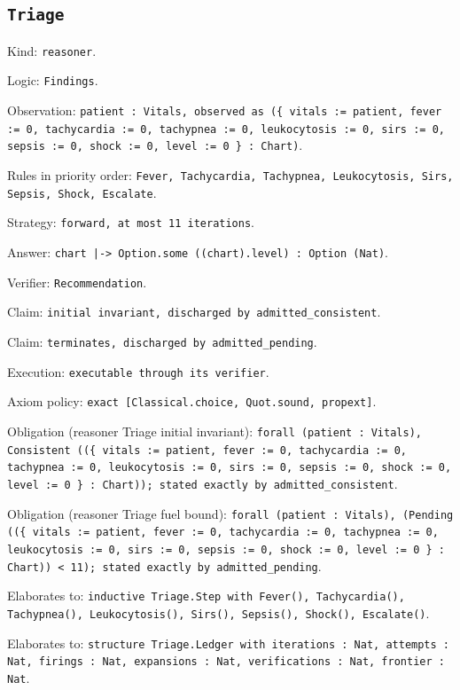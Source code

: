 \documentclass[11pt]{article}
\begin{document}
\subsection*{\texttt{Triage}}
\noindent Kind: \texttt{reasoner}.\par
\noindent Logic: \texttt{Findings}.\par
\noindent Observation: \texttt{patient : Vitals, observed as (\{ vitals := patient, fever := 0, tachycardia := 0, tachypnea := 0, leukocytosis := 0, sirs := 0, sepsis := 0, shock := 0, level := 0 \} : Chart)}.\par
\noindent Rules in priority order: \texttt{Fever, Tachycardia, Tachypnea, Leukocytosis, Sirs, Sepsis, Shock, Escalate}.\par
\noindent Strategy: \texttt{forward, at most 11 iterations}.\par
\noindent Answer: \texttt{chart |-> Option.some ((chart).level) : Option (Nat)}.\par
\noindent Verifier: \texttt{Recommendation}.\par
\noindent Claim: \texttt{initial invariant, discharged by admitted\_consistent}.\par
\noindent Claim: \texttt{terminates, discharged by admitted\_pending}.\par
\noindent Execution: \texttt{executable through its verifier}.\par
\noindent Axiom policy: \texttt{exact [Classical.choice, Quot.sound, propext]}.\par
\noindent Obligation (reasoner Triage initial invariant): \texttt{forall (patient : Vitals), Consistent ((\{ vitals := patient, fever := 0, tachycardia := 0, tachypnea := 0, leukocytosis := 0, sirs := 0, sepsis := 0, shock := 0, level := 0 \} : Chart)); stated exactly by admitted\_consistent}.\par
\noindent Obligation (reasoner Triage fuel bound): \texttt{forall (patient : Vitals), (Pending ((\{ vitals := patient, fever := 0, tachycardia := 0, tachypnea := 0, leukocytosis := 0, sirs := 0, sepsis := 0, shock := 0, level := 0 \} : Chart)) < 11); stated exactly by admitted\_pending}.\par
\noindent Elaborates to: \texttt{inductive Triage.Step with Fever(), Tachycardia(), Tachypnea(), Leukocytosis(), Sirs(), Sepsis(), Shock(), Escalate()}.\par
\noindent Elaborates to: \texttt{structure Triage.Ledger with iterations : Nat, attempts : Nat, firings : Nat, expansions : Nat, verifications : Nat, frontier : Nat}.\par
\end{document}

